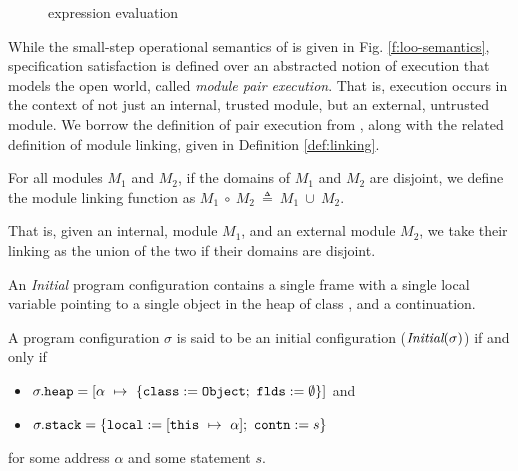 \begin{figure}[t]
\begin{minipage}{\textwidth}
\begin{minipage}{\textwidth}
\caption{\Loo expression evaluation}
\label{f:evaluation}
\end{minipage}
\end{minipage}
\end{figure}

While the small-step operational semantics of \Loo is given in Fig. \ref{f:loo-semantics},
specification satisfaction is defined over an abstracted notion of 
execution that models the open world, called \emph{module pair execution}. 
That is, execution occurs in the context of not just an internal, trusted module, but 
an external, untrusted module. We borrow the definition of pair execution 
from \citeauthor{FASE}, along with the related definition of module linking, given in Definition \ref{def:linking}.
\begin{definition}
\label{def:linking}
For all modules $M_1$ and $M_2$, if the domains of $M_1$ and $M_2$ are disjoint, 
we define the module linking function as $M_1\ \circ\ M_2\ \triangleq\ M_1\ \cup\ M_2$.
\end{definition}
That is, given an internal, module $M_1$, and an external module $M_2$, 
we take their linking as the union of the two if their domains are disjoint.



An \emph{Initial} program configuration contains a single frame 
with a single local variable  pointing to a single object 
in the heap of class , and a continuation.
\begin{definition}
\label{def:initial}
A program configuration $\sigma$ is said to be an initial configuration ($\textit{Initial}(\sigma)$)
if and only if
\begin{itemize}
\item
$\sigma.\prg{heap} = [\alpha\ \mapsto\ \{\prg{class}:=\prg{Object};\ \prg{flds}:=\emptyset\}]$ and
\item
$\sigma.{\texttt{stack}} = \{{\texttt{local}}:=[{\texttt{this}}\ \mapsto\ \alpha];\ {\texttt{contn}}:= s\}$
\end{itemize} 
for some address $\alpha$ and some statement $s$.
\end{definition}


